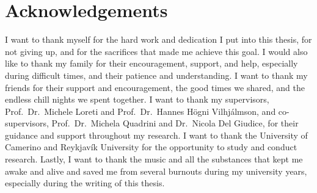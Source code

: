 \chapter*{Acknowledgements}
I want to thank myself for the hard work and dedication I put into this thesis, for not giving up, and for the sacrifices that made me achieve this goal.
I would also like to thank my family for their encouragement, support, and help, especially during difficult times, and their patience and understanding.
I want to thank my friends for their support and encouragement, the good times we shared, and the endless chill nights we spent together.
I want to thank my supervisors, Prof.~Dr.~Michele Loreti and Prof.~Dr.~Hannes H\"ogni Vilhj\'almson, and co-supervisors, Prof.~Dr.~Michela Quadrini and Dr.~Nicola Del Giudice, for their guidance and support throughout my research.
I want to thank the University of Camerino and Reykjav\'ik University for the opportunity to study and conduct research.
Lastly, I want to thank the music and all the substances that kept me awake and alive and saved me from several burnouts during my university years, especially during the writing of this thesis.
